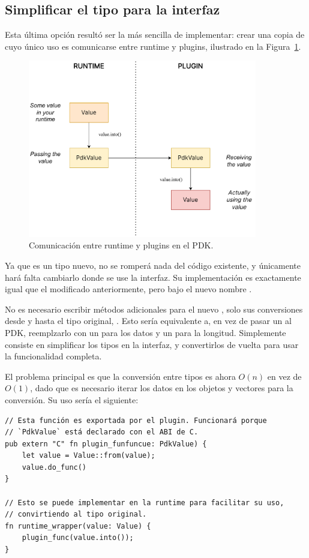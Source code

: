 \subsection{Simplificar el tipo para la interfaz}

Esta última opción resultó ser la más sencilla de implementar: crear una copia
de  cuyo único uso es comunicarse entre runtime y plugins, ilustrado
en la Figura~\ref{fig:simplify}.

\begin{figure}
    \centering
    \includegraphics[width=10cm]{./Imagenes/simplify.pdf}
    \caption{Comunicación entre runtime y plugins en el PDK.}%
    \label{fig:simplify}
\end{figure}

Ya que es un tipo nuevo, no se romperá nada del código existente, y únicamente
hará falta cambiarlo donde se use la interfaz. Su implementación es exactamente
igual que el  modificado anteriormente, pero bajo el nuevo nombre
.

No es necesario escribir métodos adicionales para el nuevo , solo
sus conversiones desde y hasta el tipo original, . Esto sería
equivalente a, en vez de pasar un  al PDK, reemplzarlo con un
 para los datos y un  para la longitud. Simplemente
consiste en simplificar los tipos en la interfaz, y convertirlos de vuelta para
usar la funcionalidad completa.

El problema principal es que la conversión entre tipos es ahora $O(n)$ en vez de
$O(1)$, dado que es necesario iterar los datos en los objetos y vectores para la
conversión. Su uso sería el siguiente:

\begin{verbatim}
// Esta función es exportada por el plugin. Funcionará porque
// `PdkValue` está declarado con el ABI de C.
pub extern "C" fn plugin_funfuncue: PdkValue) {
    let value = Value::from(value);
    value.do_func()
}

// Esto se puede implementar en la runtime para facilitar su uso,
// convirtiendo al tipo original.
fn runtime_wrapper(value: Value) {
    plugin_func(value.into());
}
\end{verbatim}

